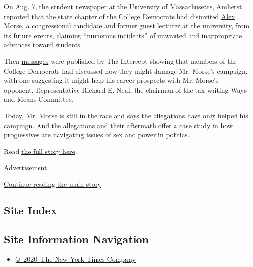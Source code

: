 On Aug. 7, the student newspaper at the University of Massachusetts,
Amherst reported that the state chapter of the College Democrats had
disinvited
\href{https://www.nytimes3xbfgragh.onion/2020/09/01/us/politics/massachusetts-elections-markey-kennedy-neal-morse.html}{Alex
Morse}, a congressional candidate and former guest lecturer at the
university, from its future events, claiming ``numerous incidents'' of
unwanted and inappropriate advances toward students.

Then
\href{https://theintercept.com/2020/08/12/alex-morse-college-democrats-chats/}{messages}
were published by The Intercept showing that members of the College
Democrats had discussed how they might damage Mr. Morse's campaign, with
one suggesting it might help his career prospects with Mr. Morse's
opponent, Representative Richard E. Neal, the chairman of the
tax-writing Ways and Means Committee.

Today, Mr. Morse is still in the race and says the allegations have only
helped his campaign. And the allegations and their aftermath offer a
case study in how progressives are navigating issues of sex and power in
politics.

Read
\href{https://www.nytimes3xbfgragh.onion/2020/08/23/us/politics/alex-morse-massachusetts.html}{the
full story here}.

Advertisement

\protect\hyperlink{after-bottom}{Continue reading the main story}

\hypertarget{site-index}{%
\subsection{Site Index}\label{site-index}}

\hypertarget{site-information-navigation}{%
\subsection{Site Information
Navigation}\label{site-information-navigation}}

\begin{itemize}
\tightlist
\item
  \href{https://help.nytimes3xbfgragh.onion/hc/en-us/articles/115014792127-Copyright-notice}{©~2020~The
  New York Times Company}
\end{itemize}


